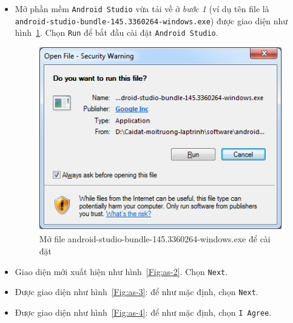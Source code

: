 \documentclass[13pt,a4paper]{extreport}
\begin{document}
\begin{itemize}
\begin{itemize}
				\item Mở phần mềm \verb|Android Studio| vừa tải về ở \textit{bước 1} (ví dụ tên file là \verb|android-studio-bundle-145.3360264-windows.exe|) được giao diện như hình~\ref{Fig:as-1}. Chọn \verb|Run| để bắt đầu cài đặt \verb|Android Studio|.
					\begin{figure}[!h]
						\begin{center}
							\includegraphics[scale=.65]{as-1.png}
						\end{center}
						\caption{Mở file android-studio-bundle-145.3360264-windows.exe để cài đặt}
						\label{Fig:as-1}
						\vspace{-1cm}
					\end{figure}

\newpage					
				\item Giao diện mới xuất hiện như hình~\ref{Fig:as-2}. Chọn \verb|Next|.
				
				\item Được giao diện như hình~\ref{Fig:as-3}: để như mặc định, chọn \verb|Next|.
				
				\item Được giao diện như hình~\ref{Fig:as-4}: để như mặc định, chọn \verb|I Agree|.	
					

\end{itemize}
\end{itemize}
\end{document}
